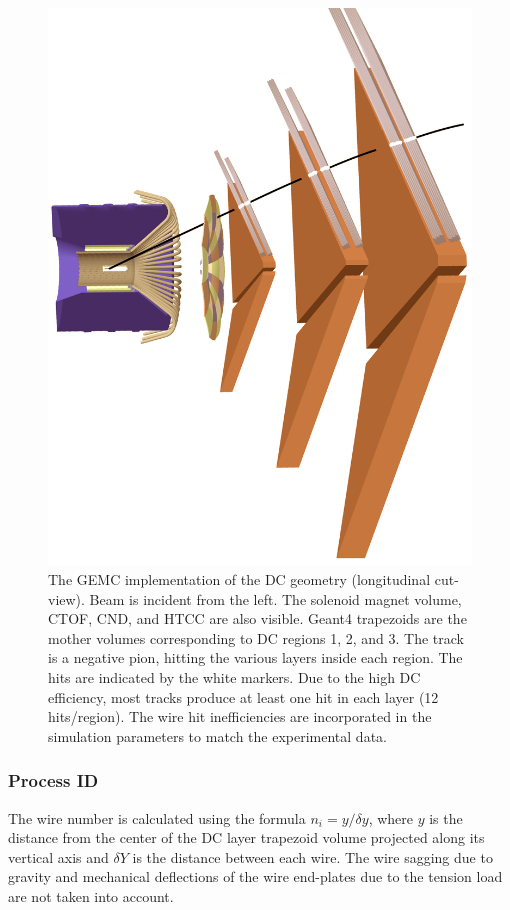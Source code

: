 \begin{figure}[h]
	\centering
	\includegraphics[width=0.99\columnwidth,keepaspectratio]{img/dcGeometry.png}
	\caption{The GEMC implementation of the DC geometry (longitudinal cut-view).
	         Beam is incident from the left. The solenoid magnet volume, CTOF, CND, and HTCC are also visible.
             Geant4 trapezoids are the mother volumes corresponding to DC regions 1, 2, and 3.
             The track is a negative pion, hitting the various layers inside each region.
             The hits are indicated by the white markers. Due to the high DC
             efficiency, most tracks produce at least one hit in each layer (12 hits/region).
             The wire hit inefficiencies are incorporated in the simulation parameters to match the experimental data.}
	\label{fig:dcGeometry}
\end{figure}


\subsubsection{Process ID}
The wire number is calculated using the formula $n_i = y/\delta y$, where $y$ is the
distance from the center of the DC layer trapezoid volume projected along its vertical axis and $\delta Y$
is the distance between each wire.
The wire sagging due to gravity and mechanical deflections of the wire end-plates due to the tension
load are not taken into account.

